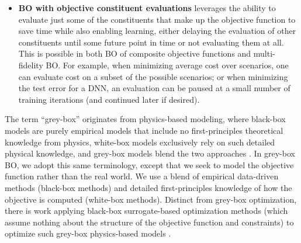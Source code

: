 \documentclass{wscpaperproc}
\theoremstyle{wsc}
\begin{document}
\begin{itemize}
\item \textbf{BO with objective constituent evaluations}
leverages the ability to evaluate just some of the constituents that make up the objective function to save time while also enabling learning, either delaying the evaluation of other constituents until some future point in time or not evaluating them at all. This is possible in both BO of composite objective functions and multi-fidelity BO.
For example, when minimizing average cost over scenarios, one can evaluate cost on a subset of the possible scenarios; or when minimizing the test error for a DNN, an evaluation can be paused at a small number of training iterations (and continued later if desired).
\end{itemize}

The term ``grey-box'' originates from physics-based modeling, where black-box models are purely empirical models that include no first-principles theoretical knowledge from physics, white-box models exclusively rely on such detailed physical knowledge, and grey-box models blend the two approaches . In grey-box BO, we adopt this same terminology, except that we seek to model the objective function rather than the real world. We use a blend of empirical data-driven methods (black-box methods) and detailed first-principles knowledge of how the objective is computed (white-box methods). Distinct from grey-box optimization, there is work applying black-box surrogate-based optimization methods (which assume nothing about the structure of the objective function and constraints) to optimize such grey-box physics-based models .
\end{document}
